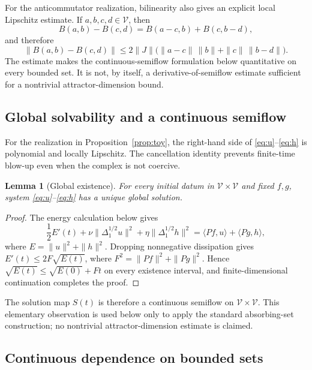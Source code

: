 \documentclass[11pt]{article}
\newtheorem{lemma}{Lemma}
\theoremstyle{remark}
\begin{document}
For the anticommutator realization, bilinearity also gives an explicit local Lipschitz estimate. If $a,b,c,d\in\mathcal V$, then
\[
B(a,b)-B(c,d)=B(a-c,b)+B(c,b-d),
\]
and therefore
\begin{equation}
\|B(a,b)-B(c,d)\|
\leq2\|J\|\bigl(\|a-c\|\,\|b\|+\|c\|\,\|b-d\|\bigr).
\label{eq:localLipschitz}
\end{equation}
The estimate makes the continuous-semiflow formulation below quantitative on every bounded set. It is not, by itself, a derivative-of-semiflow estimate sufficient for a nontrivial attractor-dimension bound.

\subsection{Global solvability and a continuous semiflow}

For the realization in Proposition~\ref{prop:toy}, the right-hand side of \eqref{eq:u}--\eqref{eq:h} is polynomial and locally Lipschitz. The cancellation identity prevents finite-time blow-up even when the complex is not coercive.

\begin{lemma}[Global existence]\label{lem:global}
For every initial datum in $\mathcal V\times\mathcal V$ and fixed $f,g$, system \eqref{eq:u}--\eqref{eq:h} has a unique global solution.
\end{lemma}

\begin{proof}
The energy calculation below gives
\[
\frac12E'(t)+\nu\|\Delta_1^{1/2}u\|^2+\eta\|\Delta_1^{1/2}h\|^2
=\langle Pf,u\rangle+\langle Pg,h\rangle,
\]
where $E=\|u\|^2+\|h\|^2$. Dropping nonnegative dissipation gives $E'(t)\leq2F\sqrt{E(t)}$, where $F^2=\|Pf\|^2+\|Pg\|^2$. Hence $\sqrt{E(t)}\leq\sqrt{E(0)}+Ft$ on every existence interval, and finite-dimensional continuation completes the proof.
\end{proof}

The solution map $S(t)$ is therefore a continuous semiflow on $\mathcal V\times\mathcal V$. This elementary observation is used below only to apply the standard absorbing-set construction; no nontrivial attractor-dimension estimate is claimed.

\subsection{Continuous dependence on bounded sets}
\end{document}
